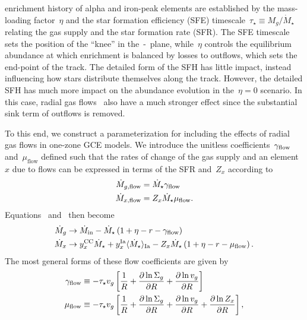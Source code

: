 enrichment history of alpha and iron-peak elements are established by
the mass-loading factor~$\eta$ and the star formation efficiency (SFE)
timescale~$\tau_\star \equiv M_g / \dot{M}_\star$ relating the
gas supply and the star formation rate (SFR).
The SFE timescale sets the position of the ``knee'' in the~\afe-\feh~plane,
while~$\eta$ controls the equilibrium abundance at which enrichment is
balanced by losses to outflows, which sets the end-point of the track.
The detailed form of the SFH has little impact, instead influencing how
stars distribute themselves along the track.
However, the detailed SFH has much more impact on the abundance evolution
in the~$\eta = 0$ scenario.
In this case, radial gas flows~\citep[e.g.,][]{Lacey1985}
also have a much stronger effect since the substantial sink term of
outflows is removed.
\par
To this end, we construct a parameterization for including the effects of
radial gas flows in one-zone GCE models.
We introduce the unitless coefficients~$\gamma_{\text{flow}}$ and~$\mu_\text{flow}$
defined such that the rates of change of the gas supply and an element~$x$ due
to flows can be expressed in terms of the SFR and~$Z_x$ according to
\begin{subequations}\begin{align}
\dot{M}_{g,\text{flow}} &= \dot{M}_\star \gamma_{\text{flow}}
\label{outflows:eq:mdot-gas-flow}
\\
\dot{M}_{x,\text{flow}} &= Z_x \dot{M}_\star \mu_{\text{flow}}.
\label{outflows:eq:mdot-element-flow}
\end{align}\end{subequations}
Equations~
and~ then become
\begin{subequations}\begin{align}
\dot{M}_{g} &\rightarrow \dot{M}_\text{in} - \dot{M}_\star
\left(1 + \eta - r - \gamma_{\text{flow}}\right)
\\
\dot{M}_x &\rightarrow y_\text{$x$}^\text{CC} \dot{M}_\star +
y_\text{$x$}^\text{Ia} \langle \dot{M}_\star \rangle_\text{Ia} -
Z_x \dot{M}_\star \left(1 + \eta - r - \mu_{\text{flow}}\right).
\end{align}\end{subequations}
The most general forms of these flow coefficients are given by
\begin{subequations}\begin{align}
\gamma_{\text{flow}} &\equiv -\tau_\star v_g \left[
\frac{1}{R} +
\frac{\partial \ln \Sigma_g}{\partial R} +
\frac{\partial \ln v_g}{\partial R}
\right]
\label{outflows:eq:gamma-flow-general}
\\
\mu_{\text{flow}} &\equiv -\tau_\star v_g \left[
\frac{1}{R} + \frac{\partial \ln \Sigma_g}{\partial R} +
\frac{\partial \ln v_g}{\partial R} +
\frac{\partial \ln Z_x}{\partial R}
\right],
\label{outflows:eq:mu-flow-general}
\end{align}\end{subequations}
